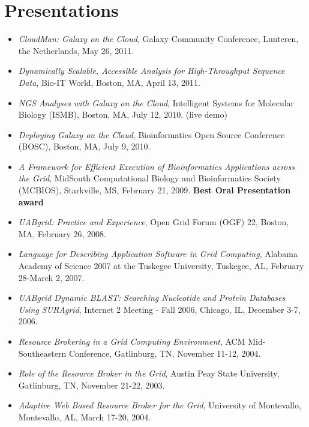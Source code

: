 \documentclass{article}
\begin{document}
%
%

\vspace{\parskip}
\section{Presentations}
\begin {itemize}
    \item \textit{CloudMan: Galaxy on the Cloud}, Galaxy Community Conference, Lunteren, the Netherlands, May 26, 2011.
    \item \textit{Dynamically Scalable, Accessible Analysis for High-Throughput Sequence Data}, Bio-IT World, Boston, MA, April 13, 2011.
    \item \textit{NGS Analyses with Galaxy on the Cloud}, Intelligent Systems for Molecular Biology (ISMB), Boston, MA, July 12, 2010. (live demo)
    \item \textit{Deploying Galaxy on the Cloud}, Bioinformatics Open Source Conference (BOSC), Boston, MA, July 9, 2010. 
    \item \textit{A Framework for Efficient Execution of Bioinformatics Applications across the Grid}, MidSouth Computational Biology and Bioinformatics Society (MCBIOS), Starkville, MS, February 21, 2009. \textbf{Best Oral Presentation award}
    \item \textit{UABgrid: Practice and Experience}, Open Grid Forum (OGF) 22, Boston, MA, February 26, 2008.
    \item \textit{Language for Describing Application Software in Grid Computing}, Alabama Academy of Science 2007 at the Tuskegee University, Tuskegee, AL, February 28-March 2, 2007.
    \item \textit{UABgrid Dynamic BLAST: Searching Nucleotide and Protein Databases Using SURAgrid}, Internet 2 Meeting - Fall 2006, Chicago, IL, December 3-7, 2006.
    \item \textit{Resource Brokering in a Grid Computing Environment}, ACM Mid-Southeastern Conference, Gatlinburg, TN, November 11-12, 2004.
    \item \textit{Role of the Resource Broker in the Grid}, Austin Peay State University, Gatlinburg, TN, November 21-22, 2003.
    \item \textit{Adaptive Web Based Resource Broker for the Grid}, University of Montevallo, Montevallo, AL, March 17-20, 2004. 
\end{itemize}

%
%

\vspace{\parskip}
\end{document}

